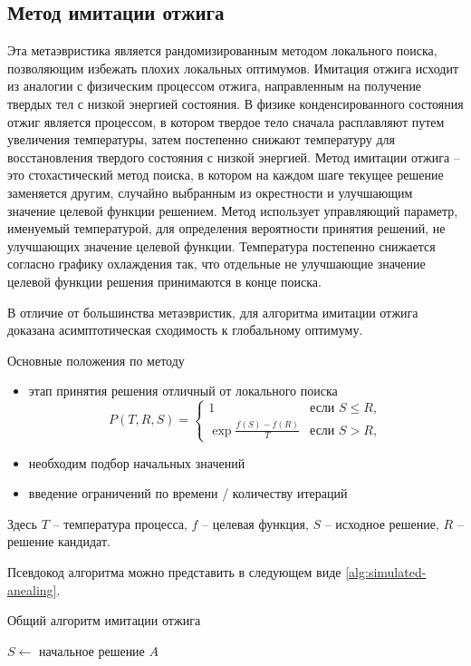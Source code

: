\subsection{Метод имитации отжига}
Эта метаэвристика является рандомизированным методом локального поиска, позволяющим избежать плохих локальных 
оптимумов. Имитация отжига исходит из аналогии с физическим процессом отжига, направленным на получение 
твердых тел с низкой энергией состояния. В физике конденсированного состояния отжиг является процессом, в 
котором твердое тело сначала расплавляют путем увеличения температуры, затем постепенно снижают температуру
для восстановления твердого состояния с низкой энергией. Метод имитации отжига -- это стохастический метод 
поиска, в котором на каждом шаге текущее решение заменяется другим, случайно выбранным из окрестности и 
улучшающим значение целевой функции решением. Метод использует управляющий параметр, именуемый температурой, 
для определения вероятности принятия решений, не улучшающих значение целевой функции. Температура постепенно 
снижается согласно графику охлаждения так, что отдельные не улучшающие значение целевой функции решения 
принимаются в конце поиска.

В отличие от большинства метаэвристик, для алгоритма имитации отжига доказана асимптотическая сходимость к 
глобальному оптимуму. 

Основные положения по методу
\begin{itemize}
    \item этап принятия решения отличный от локального поиска
    \[
        P(T, R, S)= \left\{\begin{array}{cc}
            1                       & \text{если } S \leq R, \\
            \exp\frac{f(S)-f(R)}{T} & \text{если } S > R,
        \end{array}\right.
    \]
    \item необходим подбор начальных значений
    \item введение ограничений по времени / количеству итераций
\end{itemize}

Здесь \( T \) -- температура процесса, \( f \) -- целевая функция, \( S \) -- исходное решение, 
\( R \) -- решение кандидат.

Псевдокод алгоритма можно представить в следующем виде \ref{alg:simulated-anealing}.

\newpage

\begin{algorithm}[ht!]
    \caption{Общий алгоритм имитации отжига}
    \( S \leftarrow \) начальное решение \( A \)\;
    \label{alg:simulated-anealing}
\end{algorithm}

